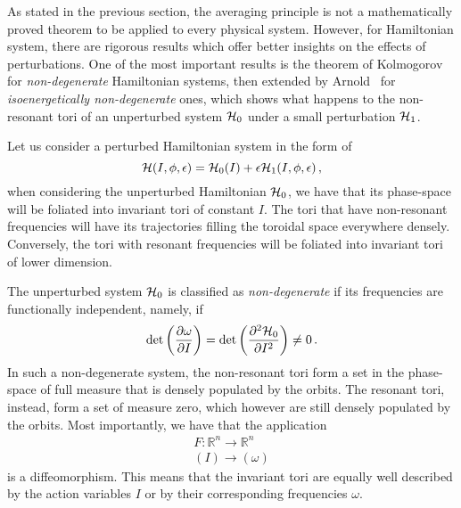 As stated in the previous section, the averaging principle is not a mathematically proved theorem to be applied to every physical system. However, for Hamiltonian system, there are rigorous results which offer better insights on the effects of perturbations. One of the most important results is the theorem of Kolmogorov~\cite{} for \textit{non-degenerate} Hamiltonian systems, then extended by Arnold~\cite{} for \textit{isoenergetically non-degenerate} ones, which shows what happens to the non-resonant tori of an unperturbed system $\mathcal{H}_0$ under a small perturbation $\mathcal{H}_1$.

Let us consider a perturbed Hamiltonian system in the form of
\begin{equation}
    \mathcal{H}(I, \phi, \epsilon) = \mathcal{H}_0(I) + \epsilon\mathcal{H}_1(I,\phi,\epsilon)\,,
    \label{eq:1:hamperturbed}
\end{equation}
when considering the unperturbed Hamiltonian $\mathcal{H}_0$, we have that its phase-space will be foliated into invariant tori of constant $I$. The tori that have non-resonant frequencies will have its trajectories filling the toroidal space everywhere densely. Conversely, the tori with resonant frequencies will be foliated into invariant tori of lower dimension.

The unperturbed system $\mathcal{H}_0$ is classified as \textit{non-degenerate} if its frequencies are functionally independent, namely, if
\begin{equation}
    \det\left(\pdv{\omega}{I}\right) = \det\left(\pdv[2]{\mathcal{H}_0}{I}\right) \neq 0 \,.
\end{equation}
In such a non-degenerate system, the non-resonant tori form a set in the phase-space of full measure that is densely populated by the orbits. The resonant tori, instead, form a set of measure zero, which however are still densely populated by the orbits. Most importantly, we have that the application
\begin{equation}
    \begin{array}{r}
    F: \mathbb{R}^{n} \longrightarrow \mathbb{R}^n \\
    (I) \longrightarrow(\omega)
    \end{array}
\end{equation}
is a diffeomorphism. This means that the invariant tori are equally well described by the action variables $I$ or by their corresponding frequencies $\omega$.

